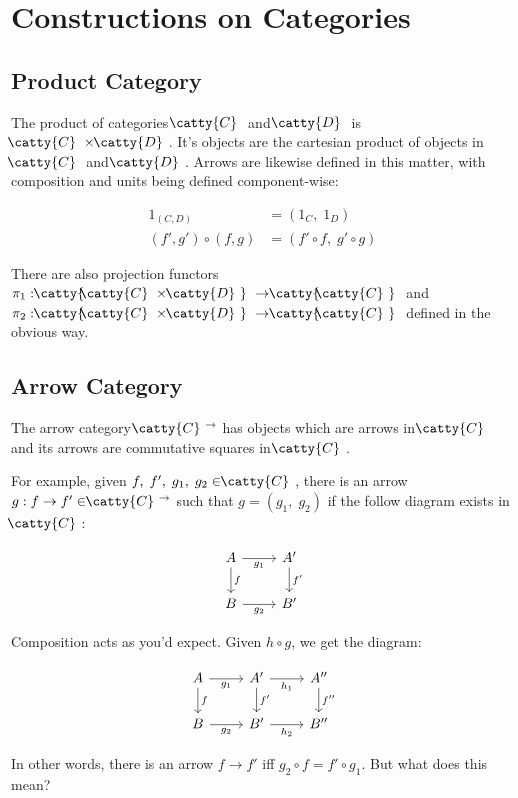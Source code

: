 \documentclass[]{article}
\newcommand{\cdr}[1]{\arrow[swap]{r}{#1}}
\newcommand{\cdd}[1]{\arrow{d}{#1}}
\newcommand{\tfarr}[4][\to]{\ensuremath{#2 : #3 #1 #4}}
\newcommand{\functor}[3]{\ensuremath{#1 : \cat{#2} \to \cat{#3}}}
\newcommand{\cat}[1]{\ensuremath{\!\! \catty{#1} \,\,}}
\begin{document}
\section{Constructions on Categories}

\subsection{Product Category}

The product of categories \cat{C} and \cat{D} is $\cat{C}\times\cat{D}$. It's
objects are the cartesian product of objects in \cat{C} and \cat{D}. Arrows are
likewise defined in this matter, with composition and units being defined
component-wise:

\begin{align*}
  1_{(C, D)} &= (1_C, \; 1_D) \\
  (f', g') \circ (f, g) &= (f' \circ f, \; g' \circ g)
\end{align*}

There are also projection functors
$\functor{\pi_1}{\cat{C}\times\cat{D}}{\cat{C}}$ and
$\functor{\pi_2}{\cat{C}\times\cat{D}}{\cat{C}}$ defined in the obvious way.

\subsection{Arrow Category}

The arrow category $\cat{C}^\rightarrow$ has objects which are arrows in \cat{C}
and its arrows are commutative squares in \cat{C}.

For example, given $f,\;f',\;g_1,\;g_2 \in \cat{C}$, there is an arrow $\tfarr{g
}{f}{f'} \in \cat{C}^\rightarrow$ such that $g = (g_1,\;g_2)$ if the follow
diagram exists in \cat{C}:

$$\begin{tikzcd}
  A \cdr{g_1} \cdd{f} & A' \cdd{f'} \\
  B \cdr{g_2} & B'
\end{tikzcd}$$

Composition acts as you'd expect. Given $h \circ g$, we get the diagram:

$$\begin{tikzcd}
  A \cdr{g_1} \cdd{f} & A' \cdr{h_1} \cdd{f'} & A'' \cdd{f''}  \\
  B \cdr{g_2} & B' \cdr{h_2} & B''
\end{tikzcd}$$

In other words, there is an arrow $f\to f'$ iff $g_2\circ f = f' \circ g_1$. But
what does this mean?
\end{document}

